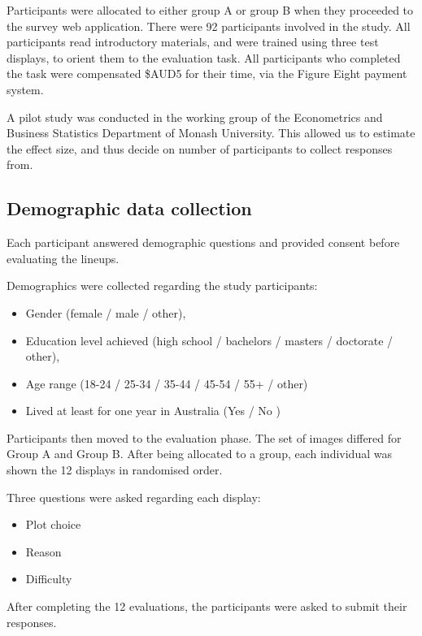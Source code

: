 \documentclass[12pt]{article}
\providecommand{\tightlist}{%
  \setlength{\itemsep}{0pt}\setlength{\parskip}{0pt}}
\begin{document}
Participants were allocated to either group A or group B when they
proceeded to the survey web application. There were 92 participants
involved in the study. All participants read introductory materials, and
were trained using three test displays, to orient them to the evaluation
task. All participants who completed the task were compensated \$AUD5
for their time, via the Figure Eight payment system.

A pilot study was conducted in the working group of the Econometrics and
Business Statistics Department of Monash University. This allowed us to
estimate the effect size, and thus decide on number of participants to
collect responses from.

\subsection{Demographic data collection}
\label{sec:ddc}

Each participant answered demographic questions and provided consent
before evaluating the lineups.

Demographics were collected regarding the study participants:

\begin{itemize}
\tightlist
\item
  Gender (female / male / other),
\item
  Education level achieved (high school / bachelors / masters /
  doctorate / other),
\item
  Age range (18-24 / 25-34 / 35-44 / 45-54 / 55+ / other)
\item
  Lived at least for one year in Australia (Yes / No )
\end{itemize}

Participants then moved to the evaluation phase. The set of images
differed for Group A and Group B. After being allocated to a group, each
individual was shown the 12 displays in randomised order.

Three questions were asked regarding each display:

\begin{itemize}
\tightlist
\item
  Plot choice
\item
  Reason
\item
  Difficulty
\end{itemize}

After completing the 12 evaluations, the participants were asked to
submit their responses.
\end{document}

